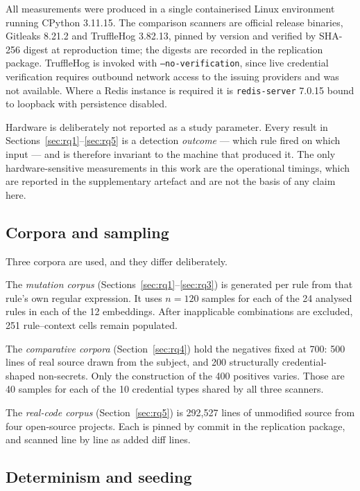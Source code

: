 \documentclass[journal]{IEEEtran}
\begin{document}
All measurements were produced in a single containerised Linux environment running CPython 3.11.15. The comparison scanners are official release binaries, Gitleaks 8.21.2 and TruffleHog 3.82.13, pinned by version and verified by SHA-256 digest at reproduction time; the digests are recorded in the replication package. TruffleHog is invoked with \texttt{--no-verification}, since live credential verification requires outbound network access to the issuing providers and was not available. Where a Redis instance is required it is \texttt{redis-server} 7.0.15 bound to loopback with persistence disabled.

Hardware is deliberately not reported as a study parameter. Every result in Sections~\ref{sec:rq1}--\ref{sec:rq5} is a detection \emph{outcome} --- which rule fired on which input --- and is therefore invariant to the machine that produced it. The only hardware-sensitive measurements in this work are the operational timings, which are reported in the supplementary artefact and are not the basis of any claim here.

\subsection{Corpora and sampling}

Three corpora are used, and they differ deliberately.

The \emph{mutation corpus} (Sections~\ref{sec:rq1}--\ref{sec:rq3}) is generated per rule from that rule's own regular expression. It uses $n=120$ samples for each of the 24 analysed rules in each of the 12 embeddings. After inapplicable combinations are excluded, 251 rule--context cells remain populated.

The \emph{comparative corpora} (Section~\ref{sec:rq4}) hold the negatives fixed at 700: 500 lines of real source drawn from the subject, and 200 structurally credential-shaped non-secrets. Only the construction of the 400 positives varies. Those are 40 samples for each of the 10 credential types shared by all three scanners.

The \emph{real-code corpus} (Section~\ref{sec:rq5}) is 292{,}527 lines of unmodified source from four open-source projects. Each is pinned by commit in the replication package, and scanned line by line as added diff lines.

\subsection{Determinism and seeding}
\end{document}
